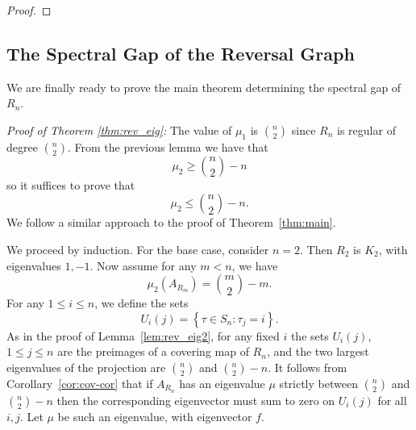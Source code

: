 \begin{proof}
  
%
%
%
\end{proof}

\subsection{The Spectral Gap of the Reversal Graph}

We are finally ready to prove the main theorem determining the spectral gap of $R_n$.

\noindent
{\it Proof of Theorem \ref{thm:rev_eig}:}
 The value of $\mu_1$ is $\binom n 2$ since $R_n$ is regular of degree $\binom n 2$.   
 From the previous lemma we have that 
  \[ \mu_2 \geq \binom{n}{2} - n\]
 so it suffices to prove that
  \[ \mu_2 \leq \binom{n}{2} - n .\]
 We follow a similar approach to the proof of 
 Theorem~\ref{thm:main}.  
 
 
 We proceed by induction.  For the base case, consider $n=2$.  Then $R_2$
 is $K_2$, with eigenvalues $1,-1$.  Now assume for any $m < n$, we have
 \[  \mu_2(A_{R_m}) = \binom{m}{2} - m . \]
 For any $1 \leq i \leq n$, we define the sets
  \[ U_i(j) = \left\{ \tau \in S_n : \tau_j = i \right\}. \]
 As in the proof of Lemma~\ref{lem:rev_eig2}, for any fixed $i$ the sets 
 $U_i(j)$, $1 \leq j \leq n$ are the preimages of a covering map of $R_n$,
 and the two largest eigenvalues of the projection are $\binom{n}{2}$ and
 $\binom{n}{2} - n$.  It follows from Corollary~\ref{cor:cov-cor}
 that if $A_{R_n}$ has an eigenvalue $\mu$ strictly between $\binom{n}{2}$
 and $\binom{n}{2} - n$ then the corresponding eigenvector must sum to zero
 on $U_i(j)$ for all $i,j$.  Let $\mu$ be such an eigenvalue, with 
 eigenvector $f$.
 
